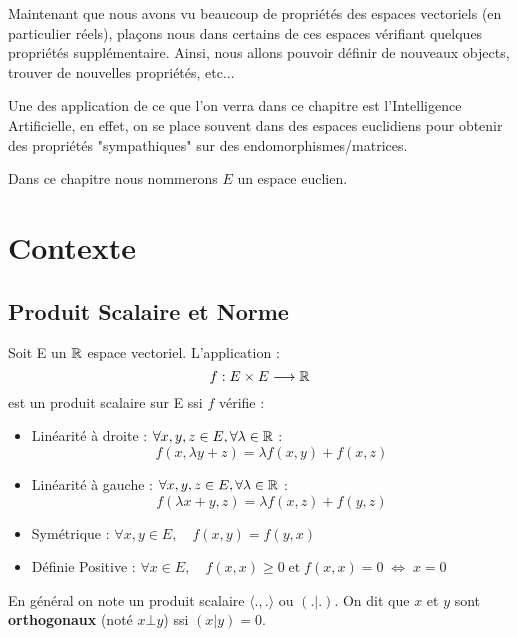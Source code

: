 

\setlength{\parindent}{0pt}
\renewcommand{\labelitemi}{\textbullet} %


\minitoc  %

Maintenant que nous avons vu beaucoup de propriétés des espaces vectoriels (en particulier réels), plaçons nous dans 
certains de ces espaces vérifiant quelques propriétés supplémentaire. Ainsi, nous allons pouvoir définir de nouveaux 
objects, trouver de nouvelles propriétés, etc... 

Une des application de ce que l'on verra dans ce chapitre est l'Intelligence Artificielle, en effet, on se place souvent 
dans des espaces euclidiens pour obtenir des propriétés "sympathiques" sur des endomorphismes/matrices. 

\vspace{0.3cm}

Dans ce chapitre nous nommerons $E$ un espace euclien. 


\section{Contexte}

\subsection{Produit Scalaire et Norme}

\begin{definition}
    Soit E un $\mathbb{R}$ espace vectoriel. L'application : \[ f : E \times E \longrightarrow \mathbb{R}  \] est un {produit scalaire} sur E ssi $f$ vérifie :
    \begin{itemize}
        \item {Linéarité à droite : } $\forall x, y, z \in E, \forall \lambda \in \mathbb{R} $ : \[ f(x, \lambda y + z) = \lambda f(x, y) + f(x, z) \] 
        \item {Linéarité à gauche : } $\forall x, y, z \in E, \forall \lambda \in \mathbb{R} $ : \[ f(\lambda x + y, z) = \lambda f(x, z) + f(y, z) \] 
        \item {Symétrique : } $ \forall x, y \in E, \quad f(x, y) = f(y, x) $
        \item {Définie Positive : } $ \forall x \in E, \quad f(x, x) \geqslant0 \; \text{et} \; f(x, x) = 0 \; \Longleftrightarrow \; x = 0 $
    \end{itemize}
    En général on note un produit scalaire $\langle ., . \rangle$ ou $(.|.)$. 
    On dit que $x$ et $y$ sont \textbf{orthogonaux} (noté $ x \bot y $) ssi $(x|y) = 0$.
\end{definition}

